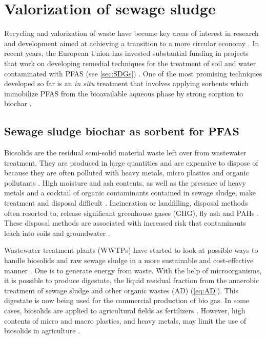 
\section{Valorization of sewage sludge}
Recycling and valorization of waste have become key areas of interest in research and development aimed at achieving a transition to a more circular economy \citep{Ahmad2014}. In recent years, the European Union has invested substantial funding in projects that work on developing remedial techniques for the treatment of soil and water contaminated with PFAS (see \cref{sec:SDGs}) \citep{EC2020PFAS,ECHA2020}. One of the most promising techniques developed so far is an \textit{in situ} treatment that involves applying sorbents which immobilize PFAS from the bioavailable aqueous phase by strong sorption to biochar \citep{Ahmad2014,Sormo2021,Kupryianchyk2016b}.

\subsection{Sewage sludge biochar as sorbent for PFAS}
Biosolids are the residual semi-solid material waste left over from wastewater treatment. They are produced in large quantities and are expensive to dispose of because they are often polluted with heavy metals, micro plastics and organic pollutants \citep{Raheem2018}. High moisture and ash contents, as well as the presence of heavy metals and a cocktail of organic contaminants contained in sewage sludge, make treatment and disposal difficult \citep{Li2019}. Incineration or landfilling, disposal methods often resorted to, release significant greenhouse gases (GHG), fly ash and PAHs \citep{huang2022comparative}. These disposal methods are associated with increased risk that contaminants leach into soils and groundwater \citep{propp2021organic}. 

Wastewater treatment plants (WWTPs) have started to look at possible ways to handle biosolids and raw sewage sludge in a more sustainable and cost-effective manner \citep{Raheem2018}. One is to generate energy from waste. With the help of microorganisms, it is possible to produce digestate, the liquid residual fraction from the anaerobic treatment of sewage sludge and other organic wastes  (AD) (\cref{eq:AD}). This digestate is now being used for the commercial production of bio gas. In some cases, biosolids are applied to agricultural fields as fertilizers \citep{moodie2021legacy}. However, high contents of micro and macro plastics, and heavy metals, may limit the use of biosolids in agriculture \citep{mohajerani2020microplastics}.

